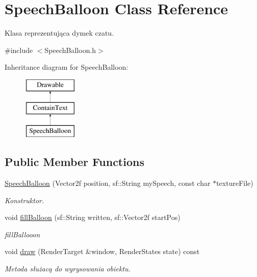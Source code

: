 \hypertarget{class_speech_balloon}{}\section{Speech\+Balloon Class Reference}
\label{class_speech_balloon}


Klasa reprezentująca dymek czatu.  




{\ttfamily \#include $<$Speech\+Balloon.\+h$>$}

Inheritance diagram for Speech\+Balloon\+:\begin{figure}[H]
\begin{center}
\leavevmode
\includegraphics[height=3.000000cm]{class_speech_balloon}
\end{center}
\end{figure}
\subsection*{Public Member Functions}
\begin{DoxyCompactItemize}
\item 
\mbox{\hyperlink{class_speech_balloon_a072b0566250dac05537d0567e5bd0796}{Speech\+Balloon}} (Vector2f position, sf\+::\+String my\+Speech, const char $\ast$texture\+File)
\begin{DoxyCompactList}\small\item\em Konstruktor. \end{DoxyCompactList}\item 
void \mbox{\hyperlink{class_speech_balloon_ad73057bdf7d7fe0817612f32a7765c69}{fill\+Balloon}} (sf\+::\+String written, sf\+::\+Vector2f start\+Pos)
\begin{DoxyCompactList}\small\item\em fill\+Ballooon \end{DoxyCompactList}\item 
void \mbox{\hyperlink{class_speech_balloon_afcbae5782428b8aa53dbd544863a15e9}{draw}} (Render\+Target \&window, Render\+States state) const
\begin{DoxyCompactList}\small\item\em Metoda służacą do wyrysowania obiektu. \end{DoxyCompactList}\end{DoxyCompactItemize}
